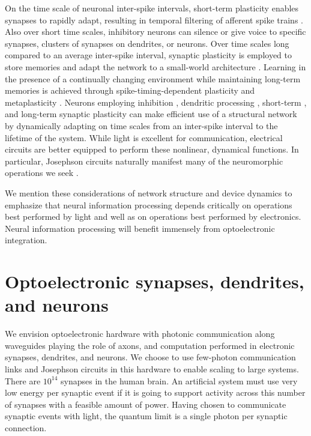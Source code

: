 \documentclass[twocolumn]{article}
\begin{document}
On the time scale of neuronal inter-spike intervals, short-term plasticity enables synapses to rapidly adapt, resulting in temporal filtering of afferent spike trains \cite{abre2004}. Also over short time scales, inhibitory neurons can silence or give voice to specific synapses, clusters of synapses on dendrites, or neurons. Over time scales long compared to an average inter-spike interval, synaptic plasticity is employed to store memories and adapt the network to a small-world architecture \cite{shki2006}. Learning in the presence of a continually changing environment while maintaining long-term memories is achieved through spike-timing-dependent plasticity \cite{mage2012} and metaplasticity \cite{fudr2005,ab2008}. Neurons employing inhibition \cite{bu2006}, dendritic processing \cite{stsp2015}, short-term \cite{abre2004}, and long-term synaptic plasticity \cite{mage2012,ab2008,fudr2005} can make efficient use of a structural network by dynamically adapting on time scales from an inter-spike interval to the lifetime of the system. While light is excellent for communication, electrical circuits are better equipped to perform these nonlinear, dynamical functions. In particular, Josephson circuits naturally manifest many of the neuromorphic operations we seek \cite{sh2018,sh2019_fluxonic}.

We mention these considerations of network structure and device dynamics to emphasize that neural information processing depends critically on operations best performed by light and well as on operations best performed by electronics. Neural information processing will benefit immensely from optoelectronic integration.

\section{\label{sec:synapsesDendritesAndNeurons}Optoelectronic synapses, dendrites, and neurons}
We envision optoelectronic hardware with photonic communication along waveguides playing the role of axons, and computation performed in electronic synapses, dendrites, and neurons. We choose to use few-photon communication links and Josephson circuits in this hardware to enable scaling to large systems. There are $10^{14}$ synapses in the human brain. An artificial system must use very low energy per synaptic event if it is going to support activity across this number of synapses with a feasible amount of power. Having chosen to communicate synaptic events with light, the quantum limit is a single photon per synaptic connection. 
\end{document}
